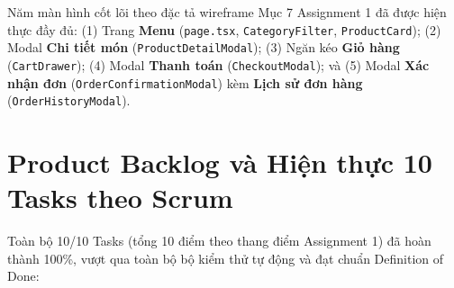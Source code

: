 \documentclass[a4paper,12pt]{article}
\begin{document}
Năm màn hình cốt lõi theo đặc tả wireframe Mục 7 Assignment 1 đã được hiện thực đầy đủ: (1) Trang \textbf{Menu} (\texttt{page.tsx}, \texttt{CategoryFilter}, \texttt{ProductCard}); (2) Modal \textbf{Chi tiết món} (\texttt{ProductDetailModal}); (3) Ngăn kéo \textbf{Giỏ hàng} (\texttt{CartDrawer}); (4) Modal \textbf{Thanh toán} (\texttt{CheckoutModal}); và (5) Modal \textbf{Xác nhận đơn} (\texttt{OrderConfirmationModal}) kèm \textbf{Lịch sử đơn hàng} (\texttt{OrderHistoryModal}).

\newpage
\section{Product Backlog và Hiện thực 10 Tasks theo Scrum}

Toàn bộ 10/10 Tasks (tổng 10 điểm theo thang điểm Assignment 1) đã hoàn thành 100\%, vượt qua toàn bộ bộ kiểm thử tự động và đạt chuẩn Definition of Done:
\end{document}

